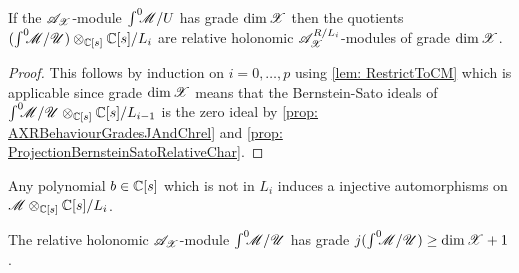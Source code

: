 \begin{lemma}\label{lem: QuotientsRelativeHolonomic}
  If the $\mathscr{A}_{\mathscr{X}}$-module $\int^0 \mkern -8mu\mathscr{M}/U$ has grade $\dim \mathscr{X}$ then the quotients $(\int^0 \mkern -8mu\mathscr{M}/\mathscr{U})\otimes_{\mathbb{C}[s]} \mathbb{C}[s]/L_{i}$ are relative holonomic $\mathscr{A}_{\mathscr{X}}^{R/L_i}$-modules of grade $\dim\mathscr{X}$.
\end{lemma}
\begin{proof}
  This follows by induction on $i=0,\ldots,p$ using \cref{lem: RestrictToCM} which is applicable since grade $\dim \mathscr{X}$ means that the Bernstein-Sato ideals of $\int^0 \mkern -8mu\mathscr{M}/\mathscr{U} \otimes_{\mathbb{C}[s]} \mathbb{C}[s]/L_{i-1}$ is the zero ideal by \cref{prop: AXRBehaviourGradesJAndChrel} and \cref{prop: ProjectionBernsteinSatoRelativeChar}.
\end{proof}
\begin{lemma}\label{lem: InjectiveEll}
  Any polynomial $b\in \mathbb{C}[s]$ which is not in $L_i$ induces a injective automorphisms on $\mathscr{M} \otimes_{\mathbb{C}[s]}\mathbb{C}[s]/L_i$.
\end{lemma}
\begin{lemma}\label{lem: GradeNPlusOne}
  The relative holonomic $\mathscr{A}_{\mathscr{X}}$-module $\int^0 \mkern -8mu\mathscr{M}/\mathscr{U}$ has grade $j(\int^0 \mkern -8mu\mathscr{M}/\mathscr{U})\geq \dim \mathscr{X}+1$.
\end{lemma}
